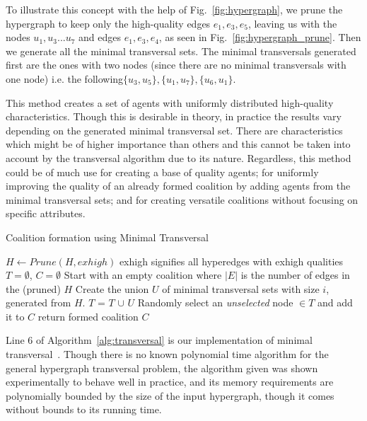 To illustrate this concept with the help of Fig.~\ref{fig:hypergraph}, we prune the hypergraph to keep only the high-quality edges $e_1, e_3, e_5$, leaving us with the nodes $u_1, u_3...u_7$ and edges $e_1, e_3, e_4$, as seen in Fig.~\ref{fig:hypergraph_prune}. Then we generate all the minimal transversal sets. The minimal transversals generated first are the ones with two nodes (since there are no minimal transversals with one node) i.e. the following$\{u_3, u_5\}, \{u_1,u_7\}, \{ u_6, u_1\}$.%

This method creates a set of agents with uniformly distributed high-quality characteristics. Though this is desirable in theory, in practice the results vary depending on the generated minimal transversal set. There are characteristics which might be of higher importance than others and this cannot be taken into account by the transversal algorithm due to its nature. Regardless, this method could be of much use for creating a base of quality agents; for uniformly improving the quality of an already formed coalition by adding agents from the minimal transversal sets; and for creating versatile coalitions without focusing on specific attributes.

\begin{algorithm}
	\caption{Coalition formation using Minimal Transversal}\label{alg:transversal}
	\begin{algorithmic}[1]
		\State $H \gets Prune(H, exhigh)$ \Comment exhigh signifies all hyperedges with exhigh qualities
		\State $T= \emptyset$, $C = \emptyset$ \Comment Start with an empty coalition
		 \Comment where $|E|$ is the number of edges in the (pruned) $H$
		\State Create the union $U$ of minimal transversal sets with size $i$, generated from $H$.
		\State $T$ = $T$ $\cup$ $U$
		\State Randomly select an {\em unselected} node  $\in T $ and add it to $C$
		\EndWhile
		\State return formed coalition $C$
		\EndIf
		\EndFor
		\EndProcedure
	\end{algorithmic}
\end{algorithm}

Line 6 of Algorithm~\ref{alg:transversal} is our implementation of minimal transversal~\cite{eiter1995identifying}. Though there is no known polynomial time algorithm for the general hypergraph transversal problem, the algorithm given was shown experimentally to behave well in practice, and its memory requirements are polynomially bounded by the size of the input hypergraph, though it comes without bounds to its running time.



